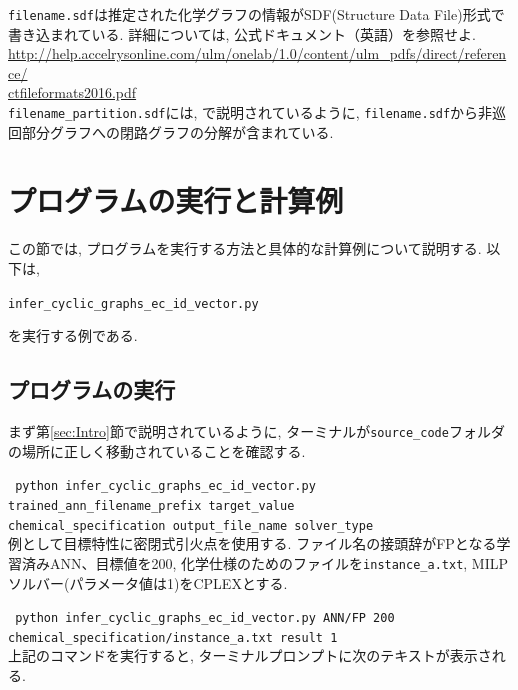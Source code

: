 \documentclass[11pt, titlepage, dvipdfmx, twoside]{jarticle}
\newcommand{\target}{目標}
\begin{document}
\noindent
{\tt filename.sdf}は推定された化学グラフの情報がSDF(Structure Data File)形式で書き込まれている. 
詳細については, 公式ドキュメント（英語）を参照せよ.  \\
\url{http://help.accelrysonline.com/ulm/onelab/1.0/content/ulm_pdfs/direct/reference/}\\
\url{ctfileformats2016.pdf}\\

\noindent
{\tt filename\_partition.sdf}には, \cite{cyclic_BH_arxiv}で説明されているように, {\tt filename.sdf}から非巡回部分グラフへの閉路グラフの分解が含まれている. 

\section{プログラムの実行と計算例}
\label{sec:Exp}

この節では, プログラムを実行する方法と具体的な計算例について説明する.
以下は,
\begin{center}
  {\tt infer\_cyclic\_graphs\_ec\_id\_vector.py}
\end{center}
を実行する例である. 

\subsection{プログラムの実行}
\label{sec:Exp_1}

まず第\ref{sec:Intro}節で説明されているように, ターミナルが{\tt source\_code}フォルダの場所に正しく移動されていることを確認する. 



\noindent
{\tt 
 python  infer\_cyclic\_graphs\_ec\_id\_vector.py 
trained\_ann\_filename\_prefix
target\_value \\
 \phantom{python }
 chemical\_specification
output\_file\_name
solver\_type
 }\\

例として\target 特性に密閉式引火点を使用する. ファイル名の接頭辞がFPとなる学習済みANN、\target 値を200, 化学仕様のためのファイルを{\tt instance\_a.txt}, MILPソルバー(パラメータ値は1)をCPLEX\cite{cplex}とする. 

{\tt 
 python infer\_cyclic\_graphs\_ec\_id\_vector.py 
ANN/FP
200 \\
 \phantom{python }
chemical\_specification/instance\_a.txt
result
1
 }\\


上記のコマンドを実行すると, ターミナルプロンプトに次のテキストが表示される. 
\end{document}
